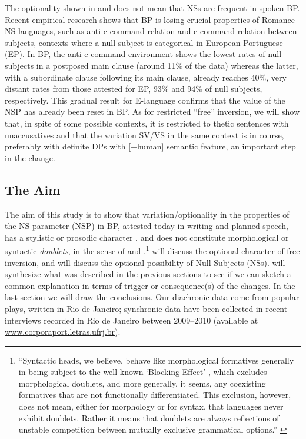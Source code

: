 \documentclass[output=paper,colorlinks,citecolor=brown]{langscibook}
\begin{document}
The optionality shown in  and  does not mean that NSs are frequent in spoken BP. Recent empirical research \citep{duarte_sociolinguistics_2020} shows that BP is losing crucial properties of Romance NS languages, such as anti-c-command relation and c-command relation between subjects, contexts where a null subject is categorical in European Portuguese (EP). In BP, the anti-c-command environment shows the lowest rates of null subjects in a postposed main clause (around 11\% of the data) whereas the latter, with a subordinate clause following its main clause, already reaches 40\%, very distant rates from those attested for EP, 93\% and 94\% of null subjects, respectively. This gradual result for E-language confirms that the value of the NSP has already been reset in BP. As for restricted “free” inversion, we will show that, in spite of some possible contexts, it is restricted to thetic sentences with unaccusatives and that the variation SV/VS in the same context is in course, preferably with definite DPs with [+human] semantic feature, an important step in the change.

\subsection{The Aim}

The aim of this study is to show that variation/optionality in the properties of the NS parameter (NSP) in BP, attested today in writing and planned speech, has a stylistic or prosodic character \citep{kato2013a}, and does not constitute morphological or syntactic \emph{doublets}, in the sense of \citet{aronoff1976} and \citet{kroch_morphosyntactic_1994}.\footnote{“Syntactic heads, we believe, behave like morphological formatives generally in being subject to the well-known `Blocking Effect' \citep{aronoff1976}, which excludes morphological doublets, and more generally, it seems, any coexisting formatives that are not functionally differentiated. This  exclusion, however, does not mean, either for morphology or for syntax, that languages never exhibit doublets. Rather it means that doublets are always reflections of unstable competition between mutually exclusive grammatical options.” \citep[181]{kroch_morphosyntactic_1994}}  will discuss the optional character of free inversion, and  will discuss the optional possibility of Null Subjects (NSs).   will synthesize  what was described in the previous sections to see if we can sketch a common explanation in terms of trigger or consequence(s) of the changes. In the last section we will draw the conclusions. Our diachronic data come from popular plays, written in Rio de Janeiro; synchronic data have been collected in recent interviews recorded in Rio de Janeiro between 2009--2010 (available at \url{www.corporaport.letras.ufrj.br}).
\end{document}
